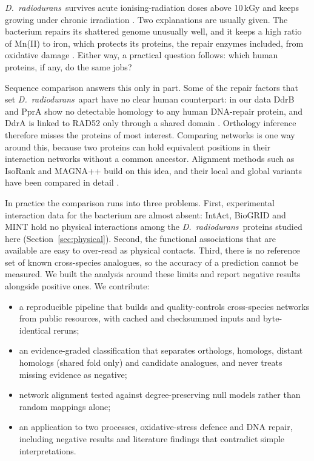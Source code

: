 \documentclass[conference]{IEEEtran}
\newcommand{\Dr}{\emph{D.~radiodurans}}
\begin{document}
\Dr\ survives acute ionising-radiation doses above 10\,kGy and keeps growing under chronic
irradiation \cite{daly2004}. Two explanations are usually given. The bacterium repairs its
shattered genome unusually well, and it keeps a high ratio of Mn(II) to iron, which protects its
proteins, the repair enzymes included, from oxidative damage
\cite{daly2004,daly2007,daly2009,slade2011}. Either way, a practical question follows: which human
proteins, if any, do the same jobs?

Sequence comparison answers this only in part. Some of the repair factors that set \Dr\ apart have
no clear human counterpart: in our data DdrB and PprA show no detectable homology to any human
DNA-repair protein, and DdrA is linked to RAD52 only through a shared domain \cite{harris2004}.
Orthology inference \cite{orthofinder} therefore misses the proteins of most interest. Comparing
networks is one way around this, because two proteins can hold equivalent positions in their
interaction networks without a common ancestor. Alignment methods such as IsoRank \cite{isorank}
and MAGNA++ \cite{magna} build on this idea, and their local and global variants have been
compared in detail \cite{guzzi2018}.

In practice the comparison runs into three problems. First, experimental interaction data for the
bacterium are almost absent: IntAct, BioGRID and MINT hold no physical interactions among the \Dr\
proteins studied here (Section~\ref{sec:physical}). Second, the functional associations that are
available are easy to over-read as physical contacts. Third, there is no reference set of known
cross-species analogues, so the accuracy of a prediction cannot be measured. We built the analysis
around these limits and report negative results alongside positive ones. We contribute:
\begin{itemize}
  \item a reproducible pipeline that builds and quality-controls cross-species networks from
    public resources, with cached and checksummed inputs and byte-identical reruns;
  \item an evidence-graded classification that separates orthologs, homologs, distant homologs
    (shared fold only) and candidate analogues, and never treats missing evidence as negative;
  \item network alignment tested against degree-preserving null models rather than random
    mappings alone;
  \item an application to two processes, oxidative-stress defence and DNA repair, including
    negative results and literature findings that contradict simple interpretations.
\end{itemize}
\end{document}
